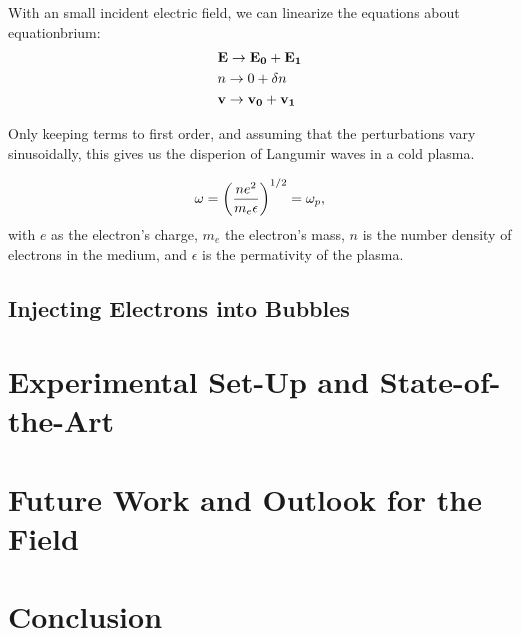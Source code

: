 \documentclass[12pt, titlepage]{article}
\begin{document}
With an small incident electric field, we can linearize the equations about
equationbrium:
\begin{align*}
    &\vb{E} \rightarrow \vb{E_0} + \vb{E_1}\\
    &n \rightarrow 0 + \delta n \\
    &\vb{v} \rightarrow \vb{v_0} + \vb{v_1}
\end{align*}

Only keeping terms to first order, and assuming that the perturbations vary sinusoidally,
this gives us the disperion of Langumir waves in a cold plasma. 

\begin{equation}
\label{eq:dispersion}
\omega = \qty(\frac{ne^2}{m_e \epsilon})^{1/2} = \omega_p,
\end{equation}
with $e$ as the electron's charge, $m_e$ the electron's mass, $n$ is the number
density of electrons in the medium, and $\epsilon$ is the permativity of the plasma.


\subsection{Injecting Electrons into Bubbles}

\section{Experimental Set-Up and State-of-the-Art}

\section{Future Work and Outlook for the Field}

\section{Conclusion}
\end{document}
